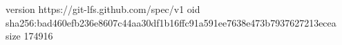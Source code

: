 version https://git-lfs.github.com/spec/v1
oid sha256:bad460efb236e8607c44aa30df1b16ffc91a591ee7638e473b7937627213ecea
size 174916
